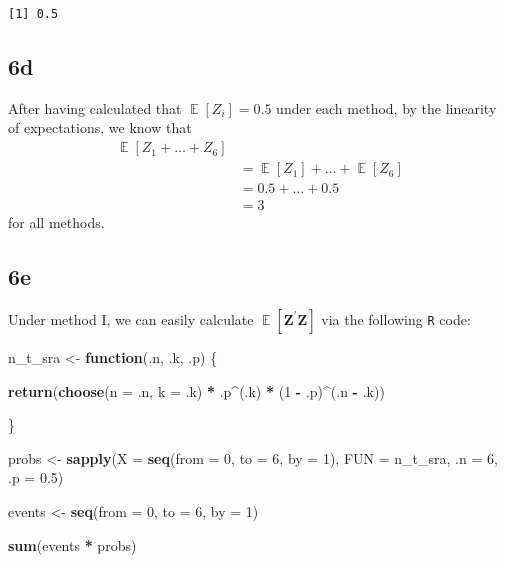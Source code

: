 \documentclass[
  12pt,
  leqno]{article}
\newenvironment{Shaded}{\begin{snugshade}}{\end{snugshade}}
\newcommand{\ControlFlowTok}[1]{\textcolor[rgb]{0.13,0.29,0.53}{\textbf{#1}}}
\newcommand{\DataTypeTok}[1]{\textcolor[rgb]{0.13,0.29,0.53}{#1}}
\newcommand{\DecValTok}[1]{\textcolor[rgb]{0.00,0.00,0.81}{#1}}
\newcommand{\FloatTok}[1]{\textcolor[rgb]{0.00,0.00,0.81}{#1}}
\newcommand{\KeywordTok}[1]{\textcolor[rgb]{0.13,0.29,0.53}{\textbf{#1}}}
\newcommand{\NormalTok}[1]{#1}
\newcommand{\OperatorTok}[1]{\textcolor[rgb]{0.81,0.36,0.00}{\textbf{#1}}}
\newcommand{\StringTok}[1]{\textcolor[rgb]{0.31,0.60,0.02}{#1}}
\DeclareMathOperator{\E}{\mathbb{E}}
\begin{document}
\begin{verbatim}
[1] 0.5
\end{verbatim}

\subsection*{6d}

After having calculated that \(\E\left[Z_i\right] = 0.5\) under each
method, by the linearity of expectations, we know that \begin{align*}
\E\left[Z_1 + \dots + Z_6\right] \\
& = \E\left[Z_1\right] + \dots + \E\left[Z_6\right] \\
& = 0.5 + \dots + 0.5 \\
& = 3
\end{align*} for all methods.

\subsection*{6e}

Under method I, we can easily calculate
\(\E\left[\mathbf{Z}^{\prime}\mathbf{Z}\right]\) via the following
\texttt{R} code:

\begin{Shaded}
\begin{Highlighting}[]
\NormalTok{n\_t\_sra \textless{}{-}}\StringTok{ }\ControlFlowTok{function}\NormalTok{(.n, .k, .p) \{}
    
    \KeywordTok{return}\NormalTok{(}\KeywordTok{choose}\NormalTok{(}\DataTypeTok{n =}\NormalTok{ .n, }\DataTypeTok{k =}\NormalTok{ .k) }\OperatorTok{*}\StringTok{ }\NormalTok{.p}\OperatorTok{\^{}}\NormalTok{(.k) }\OperatorTok{*}\StringTok{ }\NormalTok{(}\DecValTok{1} \OperatorTok{{-}}\StringTok{ }\NormalTok{.p)}\OperatorTok{\^{}}\NormalTok{(.n }\OperatorTok{{-}}\StringTok{ }\NormalTok{.k))}
    
\NormalTok{\}}

\NormalTok{probs \textless{}{-}}\StringTok{ }\KeywordTok{sapply}\NormalTok{(}\DataTypeTok{X =} \KeywordTok{seq}\NormalTok{(}\DataTypeTok{from =} \DecValTok{0}\NormalTok{, }\DataTypeTok{to =} \DecValTok{6}\NormalTok{, }\DataTypeTok{by =} \DecValTok{1}\NormalTok{), }\DataTypeTok{FUN =}\NormalTok{ n\_t\_sra, }\DataTypeTok{.n =} \DecValTok{6}\NormalTok{, }\DataTypeTok{.p =} \FloatTok{0.5}\NormalTok{)}


\NormalTok{events \textless{}{-}}\StringTok{ }\KeywordTok{seq}\NormalTok{(}\DataTypeTok{from =} \DecValTok{0}\NormalTok{, }\DataTypeTok{to =} \DecValTok{6}\NormalTok{, }\DataTypeTok{by =} \DecValTok{1}\NormalTok{)}

\KeywordTok{sum}\NormalTok{(events }\OperatorTok{*}\StringTok{ }\NormalTok{probs)}
\end{Highlighting}
\end{Shaded}
\end{document}

